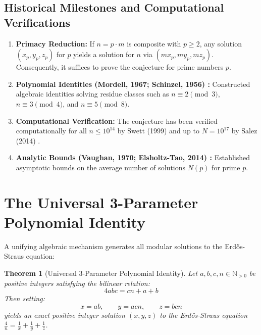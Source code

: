 \documentclass[11pt,a4paper]{article}
\newtheorem{theorem}{Theorem}[section]
\theoremstyle{definition}
\begin{document}
\subsection{Historical Milestones and Computational Verifications}
\begin{enumerate}
    \item \textbf{Primacy Reduction:} If $n = p \cdot m$ is composite with $p \ge 2$, any solution $(x_p, y_p, z_p)$ for $p$ yields a solution for $n$ via $(m x_p, m y_p, m z_p)$. Consequently, it suffices to prove the conjecture for prime numbers $p$.
    \item \textbf{Polynomial Identities (Mordell, 1967; Schinzel, 1956) \cite{mordell1967, schinzel1956}:} Constructed algebraic identities solving residue classes such as $n \equiv 2 \pmod 3$, $n \equiv 3 \pmod 4$, and $n \equiv 5 \pmod 8$.
    \item \textbf{Computational Verification:} The conjecture has been verified computationally for all $n \le 10^{14}$ by Swett (1999) and up to $N = 10^{17}$ by Salez (2014) \cite{salez2014}.
    \item \textbf{Analytic Bounds (Vaughan, 1970; Elsholtz-Tao, 2014) \cite{vaughan1970, elsholtz2014}:} Established asymptotic bounds on the average number of solutions $N(p)$ for prime $p$.
\end{enumerate}

\section{The Universal 3-Parameter Polynomial Identity}

A unifying algebraic mechanism generates all modular solutions to the Erd\H{o}s-Straus equation:

\begin{theorem}[Universal 3-Parameter Polynomial Identity]\label{thm:universal_id}
Let $a, b, c, n \in \mathbb{N}_{>0}$ be positive integers satisfying the bilinear relation:
\begin{equation}\label{eq:universal_rel}
4 a b c = c n + a + b
\end{equation}
Then setting:
\begin{equation}\label{eq:xyz_def}
x = a b, \qquad y = a c n, \qquad z = b c n
\end{equation}
yields an exact positive integer solution $(x, y, z)$ to the Erd\H{o}s-Straus equation $\frac{4}{n} = \frac{1}{x} + \frac{1}{y} + \frac{1}{z}$.
\end{theorem}
\end{document}
